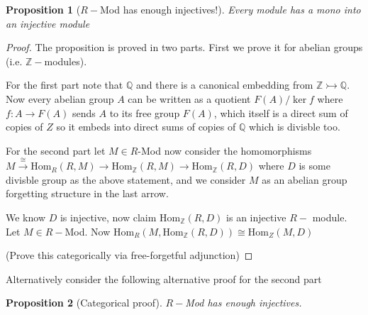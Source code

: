 \documentclass[12pt]{article}
\numberwithin{equation}{section}
\newcommand{\Q}{\mathbb{Q}}
\newcommand{\Z}{\mathbb{Z}}
\newcommand{\Hom}{{\mathrm{Hom}}}
\newtheorem{proposition}{Proposition}[section]
\begin{document}
	\begin{proposition}[$R-$Mod has enough injectives!]
		Every module has a mono into an injective module
	\end{proposition}
	\begin{proof}
	The proposition is proved in two parts. First we prove it for abelian groups (i.e. $\Z -$modules).
	
	For the first part note that $\Q $ and there is a canonical embedding from $\Z \rightarrowtail \Q$. Now every abelian group $A$ can be written as a quotient $F(A)/\ker f$
	where $f: A \to F(A)$ sends $A$ to its free group $F(A)$, which itself is a direct sum of copies of $Z$ so it embeds into direct sums of copies of $\Q $ which is divisble too.
	
	For the second part let $M \in R$-Mod now consider the homomorphisms $M \xrightarrow{\cong} \Hom_R(R,M) \to \Hom_\Z (R,M) \to \Hom_\Z(R, D)$ where $D$ is some divisble group as the above statement, and we consider $M$ as an abelian group forgetting structure in the last arrow. 
	
	We know $D$ is injective, now claim $\Hom_\Z(R,D)$ is an injective $R-$ module. Let $M \in R-$Mod. Now $\Hom_R(M,	\Hom_\Z(R,D) ) 	\cong \Hom_Z(M, D)$
	
	(Prove this categorically via free-forgetful adjunction)
	
	
%	
%	
%	
	
	\end{proof}
Alternatively consider the following alternative proof for the second part
\begin{proposition}[Categorical proof]
	$R-$Mod has enough injectives.
\end{proposition}
\end{document}
